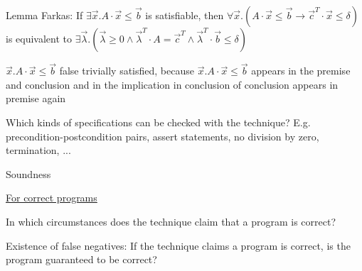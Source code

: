\documentclass[a4paper]{article}
\begin{document}
\begin{minipage}[t]{0.16\linewidth}
\begin{betterlist}
{{\begin{betterlist}
\begin{betterlist}
					\end{betterlist}
					\item \alert{Lemma Farkas}: If $\exists\vec{x} . A \cdot \vec{x} \leq\vec{b}$ is satisfiable, then $\forall\vec{x} . (A \cdot \vec{x} \leq\vec{b} \rightarrow\vec{c}^T\cdot \vec{x} \leq \delta)$ is equivalent to $\exists\vec{\lambda} . ( \vec{\lambda} \geq 0 \land\vec{\lambda}^T\cdot A =\vec{c}^T\land\vec{\lambda}^T\cdot \vec{b} \leq \delta)$
					\begin{betterlist}
						\item $\vec{x} . A \cdot \vec{x} \leq\vec{b}$ false trivially satisfied, because $\vec{x} . A \cdot \vec{x} \leq\vec{b}$ appears in the premise and conclusion and in the implication in conclusion of conclusion appears in premise again
					\end{betterlist}

				\end{betterlist}
			}}
		\item Which kinds of specifications can be checked with the technique? E.g. precondition-postcondition pairs, assert statements, no division by zero, termination, ...

		\item \alert{Soundness}
		\begin{betterlist}
			\item \underline{For correct programs}
			\begin{betterlist}
				\item In which circumstances does the technique claim that a program is correct?

				\item Existence of false negatives: If the technique claims a program is correct, is the program guaranteed to be correct?


\end{betterlist}
\end{betterlist}
\end{betterlist}
\end{minipage}
\end{document}
